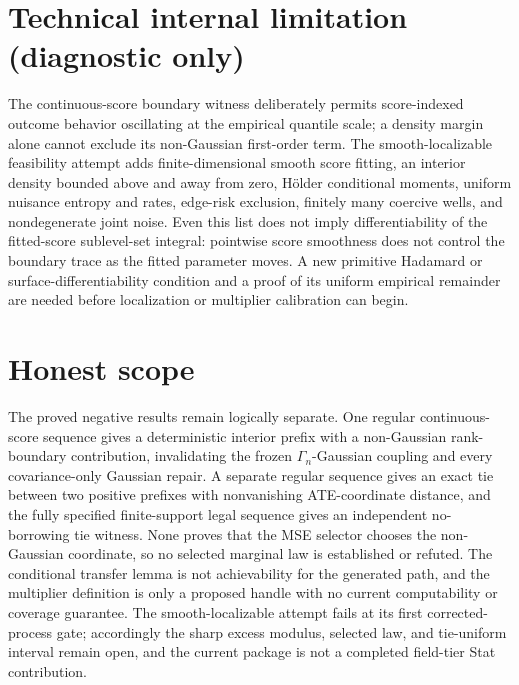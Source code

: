 \documentclass{article}
\begin{document}
\section*{Technical internal limitation (diagnostic only)}

The continuous-score boundary witness deliberately permits score-indexed outcome behavior oscillating at the empirical quantile scale; a density margin alone cannot exclude its non-Gaussian first-order term.  The smooth-localizable feasibility attempt adds finite-dimensional smooth score fitting, an interior density bounded above and away from zero, Hölder conditional moments, uniform nuisance entropy and rates, edge-risk exclusion, finitely many coercive wells, and nondegenerate joint noise.  Even this list does not imply differentiability of the fitted-score sublevel-set integral: pointwise score smoothness does not control the boundary trace as the fitted parameter moves.  A new primitive Hadamard or surface-differentiability condition and a proof of its uniform empirical remainder are needed before localization or multiplier calibration can begin.

\section{Honest scope}

The proved negative results remain logically separate.  One regular continuous-score sequence gives a deterministic interior prefix with a non-Gaussian rank-boundary contribution, invalidating the frozen \(\Gamma_n\)-Gaussian coupling and every covariance-only Gaussian repair.  A separate regular sequence gives an exact tie between two positive prefixes with nonvanishing ATE-coordinate distance, and the fully specified finite-support legal sequence gives an independent no-borrowing tie witness.  None proves that the MSE selector chooses the non-Gaussian coordinate, so no selected marginal law is established or refuted.  The conditional transfer lemma is not achievability for the generated path, and the multiplier definition is only a proposed handle with no current computability or coverage guarantee.  The smooth-localizable attempt fails at its first corrected-process gate; accordingly the sharp excess modulus, selected law, and tie-uniform interval remain open, and the current package is not a completed field-tier Stat contribution.
\end{document}
